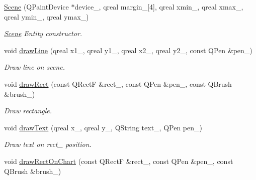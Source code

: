 \begin{DoxyCompactItemize}
\item 
\mbox{\hyperlink{classeven_1_1_scene_af610df9d9f7ea262950e1e2184874153}{Scene}} (Q\+Paint\+Device $\ast$device\+\_\+, qreal margin\+\_\+\mbox{[}4\mbox{]}, qreal xmin\+\_\+, qreal xmax\+\_\+, qreal ymin\+\_\+, qreal ymax\+\_\+)
\begin{DoxyCompactList}\small\item\em \mbox{\hyperlink{classeven_1_1_scene}{Scene}} Entity constructor. \end{DoxyCompactList}\item 
\mbox{\label{classeven_1_1_scene_a477bb59cf5656eae03ec68123a05f2e5}} 
void \mbox{\hyperlink{classeven_1_1_scene_a477bb59cf5656eae03ec68123a05f2e5}{draw\+Line}} (qreal x1\+\_\+, qreal y1\+\_\+, qreal x2\+\_\+, qreal y2\+\_\+, const Q\+Pen \&pen\+\_\+)
\begin{DoxyCompactList}\small\item\em Draw line on scene. \end{DoxyCompactList}\item 
\mbox{\label{classeven_1_1_scene_a45164ee3f314cf776041fd14a5b793d4}} 
void \mbox{\hyperlink{classeven_1_1_scene_a45164ee3f314cf776041fd14a5b793d4}{draw\+Rect}} (const Q\+RectF \&rect\+\_\+, const Q\+Pen \&pen\+\_\+, const Q\+Brush \&brush\+\_\+)
\begin{DoxyCompactList}\small\item\em Draw rectangle. \end{DoxyCompactList}\item 
\mbox{\label{classeven_1_1_scene_ac8bc7255ab96561e606ebb621a529629}} 
void \mbox{\hyperlink{classeven_1_1_scene_ac8bc7255ab96561e606ebb621a529629}{draw\+Text}} (qreal x\+\_\+, qreal y\+\_\+, Q\+String text\+\_\+, Q\+Pen pen\+\_\+)
\begin{DoxyCompactList}\small\item\em Draw text on rect\+\_\+ position. \end{DoxyCompactList}\item 
\mbox{\label{classeven_1_1_scene_aa44791cac7d3617cd3f740c1fe2a610e}} 
void \mbox{\hyperlink{classeven_1_1_scene_aa44791cac7d3617cd3f740c1fe2a610e}{draw\+Rect\+On\+Chart}} (const Q\+RectF \&rect\+\_\+, const Q\+Pen \&pen\+\_\+, const Q\+Brush \&brush\+\_\+)

\end{DoxyCompactItemize}
